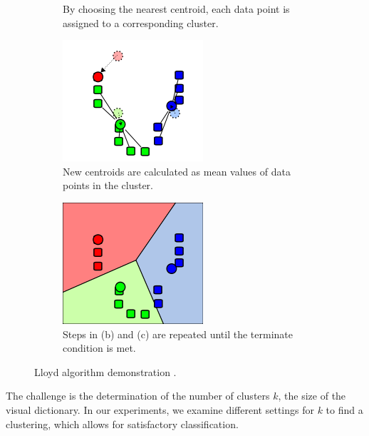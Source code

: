 \begin{figure}[ht]
\begin{subfigure}[t]{0.22\textwidth}
        \caption{By choosing the nearest centroid, each data point is assigned to a corresponding cluster.}
        \label{fig:k-means-alg:assignment_step}
    \end{subfigure}\hfill
    \begin{subfigure}[t]{0.22\textwidth}
        \includegraphics[width=\textwidth]{Figures/k-means/k-means_update_step.png}
        \caption{New centroids are calculated as mean values of data points in the cluster.}
        \label{fig:k-means-alg:update_step}
    \end{subfigure}\hfill
    \begin{subfigure}[t]{0.22\textwidth}
        \includegraphics[width=\textwidth]{Figures/k-means/k-means_assignment_step_2.png}
        \caption{Steps in (b) and (c) are repeated until the terminate condition is met.}
        \label{fig:k-means-alg:assignment_step_2}
    \end{subfigure}\hfill
    \caption[Lloyd's algorithm demonstration.]{Lloyd algorithm demonstration \cite{Wikikmeans}.}
    \label{fig:k_means_alg}
\end{figure}
The challenge is the determination of the number of clusters $k$, the size of the visual dictionary. In our experiments, we examine different settings for $k$ to find a clustering, which allows for satisfactory classification.
